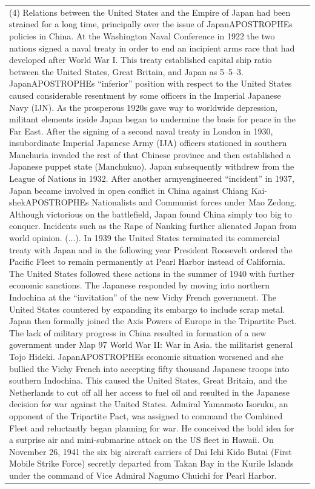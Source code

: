 {\begin{longtable}{p{}p{}}
(4) Relations between the United States and the Empire of Japan had been strained for a long time, principally over the issue of JapanAPOSTROPHEs policies in China. At the Washington Naval Conference in 1922 the two nations signed a naval treaty in order to end an incipient arms race that had developed after World War I. This treaty established capital ship ratio between the United States, Great Britain, and Japan as 5–5–3. JapanAPOSTROPHEs “inferior” position with respect to the United States caused considerable resentment by some officers in the Imperial Japanese Navy (IJN). As the prosperous 1920s gave way to worldwide depression, militant elements inside Japan began to undermine the basis for peace in the Far East. After the signing of a second naval treaty in London in 1930, insubordinate Imperial Japanese Army (IJA) officers stationed in southern Manchuria invaded the rest of that Chinese province and then established a Japanese puppet state (Manchukuo). Japan subsequently withdrew from the League of Nations in 1932. After another armyengineered “incident” in 1937, Japan became involved in open conflict in China against Chiang Kai-shekAPOSTROPHEs Nationalists and Communist forces under Mao Zedong. Although victorious on the battlefield, Japan found China simply too big to conquer. Incidents such as the Rape of Nanking further alienated Japan from world opinion. (...). 
In 1939 the United States terminated its commercial treaty with Japan and in the following year President Roosevelt ordered the Pacific Fleet to remain permanently at Pearl Harbor instead of California. The United States followed these actions in the summer of 1940 with further economic sanctions. The Japanese responded by moving into northern Indochina at the “invitation” of the new Vichy French government. The United States countered by expanding its embargo to include scrap metal. Japan then formally joined the Axis Powers of Europe in the Tripartite Pact. The lack of military progress in China resulted in formation of a new government under Map 97 World War II: War in Asia. the militarist general Tojo Hideki. JapanAPOSTROPHEs economic situation worsened and she bullied the Vichy French into accepting fifty thousand Japanese troops into southern Indochina. This caused the United States, Great Britain, and the Netherlands to cut off all her access to fuel oil and resulted in the Japanese decision for war against the United States. Admiral Yamamoto Isoruku, an opponent of the Tripartite Pact, was assigned to command the Combined Fleet and reluctantly began planning for war. He conceived the bold idea for a surprise air and mini-submarine attack on the US fleet in Hawaii. On November 26, 1941 the six big aircraft carriers of Dai Ichi Kido Butai (First Mobile Strike Force) secretly departed from Takan Bay in the Kurile Islands under the command of Vice Admiral Nagumo Chuichi for Pearl Harbor.

\end{longtable}}
